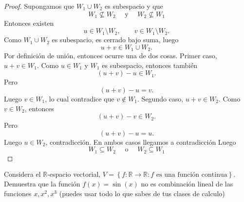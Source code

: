 \documentclass[12pt,a4paper]{article}
\begin{document}
    \begin{proof}
        Supongamos que $W_{1}\cup W_{2}$ es subespacio y que
        \begin{equation*}
            W_{1}\nsubseteq W_{2}\quad\text{ y }\quad W_{2}\nsubseteq W_{1}
        \end{equation*}
        Entonces existen
        \begin{equation*}
            u\in W_{1}\setminus W_{2},\qquad v\in W_{1}\setminus W_{2}.
        \end{equation*}
        Como $W_{1}\cup W_{2}$ es subespacio, es cerrado bajo suma, luego
        \begin{equation*}
            u+v\in W_{1}\cup W_{2}.
        \end{equation*}
        Por definición de unión, entonces ocurre una de dos cosas. Primer caso, $u+v\in W_{1}$.
        Como $u\in W_{1}$ y $W_{1}$ es subespacio, entonces también
        \begin{equation*}
            (u+v)-u\in W_{1}.
        \end{equation*}
        Pero
        \begin{equation*}
            (u+v)-u=v.
        \end{equation*}
        Luego $v\in W_{1}$, lo cual contradice que $v\notin W_{1}$. Segundo caso, $u+v\in W_{2}$.
        Como $v\in W_{2}$, entonces
        \begin{equation*}
            (u+v)-v\in W_{2}.
        \end{equation*}
        Pero
        \begin{equation*}
            (u+v)-u=u.
        \end{equation*}
        Luego $u\in W_{2}$, contradicción. En ambos casos llegamos a contradicción Luego
        \begin{equation*}
            W_{1}\subseteq W_{2}\quad\text{ o }\quad W_{2}\subseteq W_{1}
        \end{equation*}
    \end{proof}

    \begin{mdframed}[style=mdbluebox,frametitle={Ejercicio 5}]
        Considera el $\mathbb{R}$-espacio vectorial, $V=\left\{f:\mathbb{R}\to\mathbb{R}:f\text{ es una función continua}\right\}$.
        Demuestra que la función $f(x)=\sin(x)$ no es combinación lineal de las funciones $x,x^{2},x^{3}$ (puedes usar todo lo que
        sabes de tus clases de calculo)
    \end{mdframed}
\end{document}
